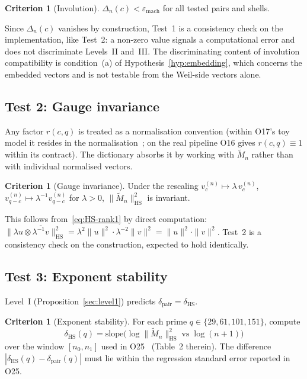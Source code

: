 \documentclass[12pt,a4paper]{article}
\theoremstyle{definition}
\newtheorem{criterion}[theorem]{Criterion}
\theoremstyle{remark}
\begin{document}
    \begin{criterion}[Involution]
  $\Delta_n(c) < \varepsilon_{\mathrm{mach}}$ for all tested pairs and shells.
    \end{criterion}

    Since $\Delta_n(c)$ vanishes by construction, Test~1 is a consistency check on the
    implementation, like Test~2: a non-zero value signals a computational error and does not
    discriminate Levels~II and~III.
    The discriminating content of involution compatibility is condition~(a) of
    Hypothesis~\ref{hyp:embedding}, which concerns the embedded vectors and is not testable from
    the Weil-side vectors alone.

  \subsection{Test 2: Gauge invariance}
    \label{sec:test2}

    Any factor $r(c,q)$ is treated as a normalisation convention (within O17's toy model it
    resides in the normalisation~\cite{Beau2026a21}; on the real pipeline O16 gives
    $r(c,q) \equiv 1$ within its contract).
    The dictionary absorbs it by working with $\widetilde{M}_n$ rather than
    with individual normalised vectors.

    \begin{criterion}[Gauge invariance]
  Under the rescaling $v_c^{(n)} \mapsto \lambda\, v_c^{(n)}$,
  $v_{q-c}^{(n)} \mapsto \lambda^{-1} v_{q-c}^{(n)}$ for $\lambda > 0$,
  $\|\widetilde{M}_n\|_{\mathrm{HS}}^2$ is invariant.
    \end{criterion}

    This follows from~\eqref{eq:HS-rank1} by direct computation:
    $\|\lambda u \otimes \overline{\lambda^{-1} v}\|_{\mathrm{HS}}^2
    = \lambda^2 \|u\|^2 \cdot \lambda^{-2} \|v\|^2
    = \|u\|^2 \cdot \|v\|^2$.
    Test~2 is a consistency check on the construction, expected to hold identically.

  \subsection{Test 3: Exponent stability}
    \label{sec:test3}

    Level~I (Proposition~\ref{sec:level1}) predicts $\delta_{\mathrm{pair}} = \delta_{\mathrm{HS}}$.

    \begin{criterion}[Exponent stability]
  For each prime $q \in \{29, 61, 101, 151\}$, compute
  \begin{equation}
    \delta_{\mathrm{HS}}(q)
    = \mathrm{slope}\bigl(
    \log \|\widetilde{M}_n\|_{\mathrm{HS}}^2 \;\mathrm{vs}\; \log(n+1)
    \bigr)
  \end{equation}
  over the window $[n_0, n_1]$ used in O25~\cite{Beau2026a29} (Table~2 therein).
  The difference $|\delta_{\mathrm{HS}}(q) - \delta_{\mathrm{pair}}(q)|$
  must lie within the regression standard error reported in O25.
    \end{criterion}
\end{document}
